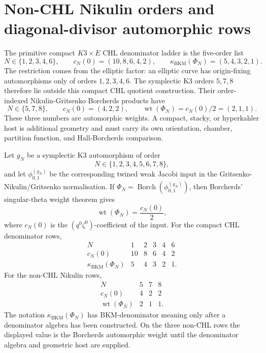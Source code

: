 \providecommand{\kBKM}{\kappa_{\mathrm{BKM}}}
\providecommand{\kch}{\kappa_{\mathrm{ch}}}
\providecommand{\kcat}{\kappa_{\mathrm{cat}}}
\providecommand{\kfib}{\kappa_{\mathrm{fiber}}}
\providecommand{\Z}{\mathbb{Z}}
\providecommand{\cO}{\mathcal{O}}
\providecommand{\SpFour}{\mathrm{Sp}_4}
\providecommand{\Aut}{\mathrm{Aut}}
\providecommand{\wt}{\operatorname{wt}}
\providecommand{\DeltaFive}{\Delta_5}
\providecommand{\PhiTen}{\Phi_{10}^{\mathrm{un}}}
\providecommand{\Dfive}{D_5}
\providecommand{\cHdiag}{\mathcal H_{\mathrm{diag}}}
\providecommand{\CoHA}{\operatorname{CoHA}}
\providecommand{\CY}{\mathrm{CY}}

\section*{Non-CHL Nikulin orders and diagonal-divisor automorphic rows}
\label{sec:n578-non-chl-nikulin-automorphic}

The primitive compact \(K3\times E\) CHL denominator ladder is the
five-order list
\[
  N\in\{1,2,3,4,6\},\qquad
  c_N(0)=(10,8,6,4,2),\qquad
  \kBKM(\Phi_N)=(5,4,3,2,1).
\]
The restriction comes from the elliptic factor: an elliptic curve has
origin-fixing automorphisms only of orders \(1,2,3,4,6\).  The
symplectic K3 orders \(5,7,8\) therefore lie outside this compact CHL
quotient construction.  Their order-indexed Nikulin-Gritsenko
Borcherds products have
\[
  N\in\{5,7,8\},\qquad
  c_N(0)=(4,2,2),\qquad
  \wt(\Phi_N)=c_N(0)/2=(2,1,1).
\]
These three numbers are automorphic weights.  A compact, stacky, or
hyperkahler host is additional geometry and must carry its own
orientation, chamber, partition function, and Hall-Borcherds comparison.

\begin{theorem}
\label{thm:n578-nikulin-order-borcherds-weights}
Let \(g_N\) be a symplectic K3 automorphism of order
\[
   N\in\{1,2,3,4,5,6,7,8\},
\]
and let \(\phi_{0,1}^{(g_N)}\) be the corresponding twined weak Jacobi
input in the Gritsenko-Nikulin/Gritsenko normalisation.  If
\(\Phi_N=\operatorname{Borch}(\phi_{0,1}^{(g_N)})\), then Borcherds'
singular-theta weight theorem gives
\[
  \wt(\Phi_N)=\frac{c_N(0)}{2},
\]
where \(c_N(0)\) is the \((q^0\zeta^0)\)-coefficient of the input.
For the compact CHL denominator rows,
\[
\begin{array}{c|ccccc}
N&1&2&3&4&6\\ \hline
c_N(0)&10&8&6&4&2\\
\kBKM(\Phi_N)&5&4&3&2&1 .
\end{array}
\]
For the non-CHL Nikulin rows,
\[
\begin{array}{c|ccc}
N&5&7&8\\ \hline
c_N(0)&4&2&2\\
\wt(\Phi_N)&2&1&1 .
\end{array}
\]
The notation \(\kBKM(\Phi_N)\) has BKM-denominator meaning only after a
denominator algebra has been constructed.  On the three non-CHL rows
the displayed value is the Borcherds automorphic weight until the
denominator algebra and geometric host are supplied.
\end{theorem}

